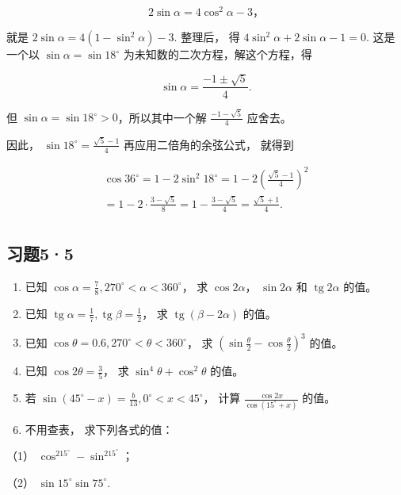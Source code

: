 \[
2 \sin \alpha = 4 \cos^ {2} \alpha - 3\text{，}
\]

就是 \(2\sin \alpha = 4(1 - \sin^2\alpha) - 3.\) 整理后， 得
\(4\sin^{2}\alpha+2\sin\alpha-1=0.\) 这是一个以
\(\sin \alpha = \sin 18^{\circ}\) 为未知数的二次方程，解这个方程，得

\[
\sin \alpha = \frac {- 1 \pm \sqrt {5}}{4}.
\]

但 \(\sin \alpha = \sin 18^{\circ} > 0\)，所以其中一个解
\(\frac{-1 - \sqrt{5}}{4}\) 应舍去。

因此， \(\sin 18^{\circ} = \frac{\sqrt{5} - 1}{4}\)
再应用二倍角的余弦公式， 就得到

\[
\begin{array}{l} \cos 36 ^{\circ} = 1 - 2 \sin^ {2} 18 ^{\circ} = 1 - 2 \left(\frac {\sqrt {5} - 1}{4}\right) ^ {2} \\ = 1 - 2 \cdot \frac {3 - \sqrt {5}}{8} = 1 - \frac {3 - \sqrt {5}}{4} = \frac {\sqrt {5} + 1}{4}. \\ \end{array}
\]

\subsection{习题5·5}

\begin{enumerate}
\item
  已知
  \(\cos \alpha = \frac{7}{8}, 270^{\circ} < \alpha < 360^{\circ}\)， 求
  \(\cos 2\alpha\)， \(\sin 2\alpha\) 和 \(\operatorname{tg} 2\alpha\)
  的值。
\item
  已知
  \(\operatorname{tg} \alpha = \frac{1}{7}, \operatorname{tg} \beta = \frac{1}{2}\)，
  求 \(\operatorname{tg} (\beta - 2\alpha)\) 的值。
\item
  已知 \(\cos \theta = 0.6, 270^{\circ} < \theta < 360^{\circ}\)， 求
  \(\left(\sin \frac{\theta}{2} - \cos \frac{\theta}{2}\right)^{3}\)
  的值。
\item
  已知 \(\cos 2\theta = \frac{3}{5}\)， 求
  \(\sin^4\theta + \cos^2\theta\) 的值。
\item
  若
  \(\sin (45^{\circ} - x) = \frac{b}{13}, 0^{\circ} < x < 45^{\circ}\)，
  计算 \(\frac{\cos 2x}{\cos (15^{\circ} + x)}\) 的值。
\item
  不用查表， 求下列各式的值：
\end{enumerate}

（1） \(\cos^215^\circ - \sin^215^\circ\)；

（2） \(\sin 15^{\circ} \sin 75^{\circ}\).

